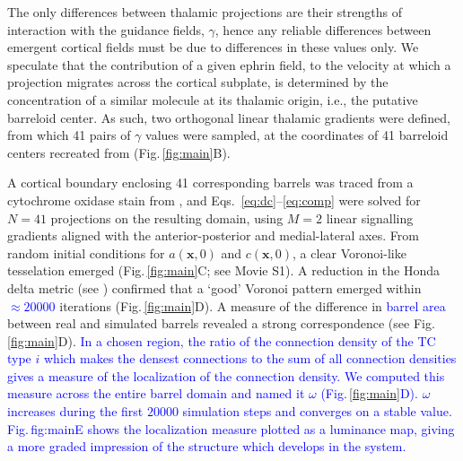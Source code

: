 \documentclass[9pt,lineno]{elife}
\newcommand{\cmnt}[1]{\textcolor{blue}{#1}}
\newcommand{\mb}[1]{\mathbf{#1}}
\begin{document}
The only differences between thalamic projections are their strengths of
interaction with the guidance fields, $\gamma$, hence any reliable differences
between emergent cortical fields must be due to differences in these values
only. We speculate that the contribution of a given ephrin field, to the
velocity at which a projection migrates across the cortical subplate, is
determined by the concentration of a similar molecule at its thalamic origin,
i.e., the putative barreloid center. As such, two orthogonal linear thalamic
gradients were defined, from which 41 pairs of $\gamma$ values were sampled,
at the coordinates of 41 barreloid centers recreated from
\cite{haidarliu_size_2001} (Fig.\,\ref{fig:main}B).

A cortical boundary enclosing 41 corresponding barrels was traced from a
cytochrome oxidase stain from \cite{zheng_signal_2001}, and
Eqs.~\ref{eq:dc}--\ref{eq:comp} were solved for $N=41$ projections on the
resulting domain, using $M=2$ linear signalling gradients aligned with the
anterior-posterior and medial-lateral axes. From random initial conditions for
$a(\mb{x},0)$ and $c(\mb{x},0)$, a clear Voronoi-like tesselation emerged
(Fig.\,\ref{fig:main}C; see Movie S1). A reduction in the Honda delta metric (see
\citealp{senft_mouse_1991}) confirmed that a `good' Voronoi pattern emerged
within \cmnt{$\approx 20000$} iterations (Fig.\,\ref{fig:main}D). A measure of the difference
in \cmnt{barrel area} between real and simulated barrels revealed a strong correspondence
(see Fig.\,\ref{fig:main}D). \cmnt{In a chosen region, the ratio of the connection density
  of the TC type $i$ which makes the densest connections to the sum of all
  connection densities gives a measure of the localization of the connection
density. We computed this measure across the entire barrel domain and named it $\omega$
(Fig.\,\ref{fig:main}D). $\omega$ increases during the first $20000$ simulation
steps and converges on a stable value. Fig.\,{fig:main}E shows
the localization measure plotted as a luminance map, giving a more graded
impression of the structure which develops in the system.}
\end{document}
